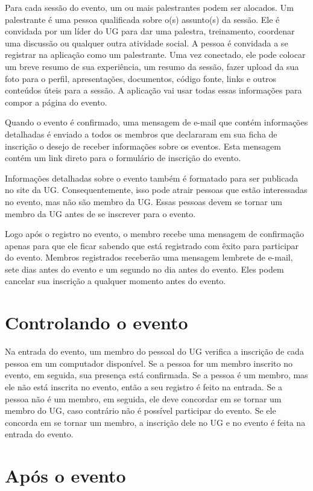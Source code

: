 \documentclass[envcountsame,envcountchap]{svmono}
\begin{document}
Para cada sessão do evento, um ou mais palestrantes podem ser alocados. Um palestrante é uma pessoa qualificada sobre o(s) assunto(s) da sessão. Ele é convidada por um líder do UG para dar uma palestra, treinamento, coordenar uma discussão ou qualquer outra atividade social. A pessoa é convidada a se registrar na aplicação como um palestrante. Uma vez conectado, ele pode colocar um breve resumo de sua experiência, um resumo da sessão, fazer upload da sua foto para o perfil, apresentações, documentos, código fonte, links e outros conteúdos úteis para a sessão. A aplicação vai usar todas essas informações para compor a página do evento.

Quando o evento é confirmado, uma mensagem de e-mail que contém informações detalhadas é enviado a todos os membros que declararam em sua ficha de inscrição o desejo de receber informações sobre os eventos. Esta mensagem contém um link direto para o formulário de inscrição do evento.

Informações detalhadas sobre o evento também é formatado para ser publicada no site da UG. Consequentemente, isso pode atrair pessoas que estão interessadas no evento, mas não são membro da UG. Essas pessoas devem se tornar um membro da UG antes de se inscrever para o evento.

Logo após o registro no evento, o membro recebe uma mensagem de confirmação apenas para que ele ficar sabendo que está registrado com êxito para participar do evento. Membros registrados receberão uma mensagem lembrete de e-mail, sete dias antes do evento e um segundo no dia antes do evento. Eles podem cancelar sua inscrição a qualquer momento antes do evento.

\section{Controlando o evento}

Na entrada do evento, um membro do pessoal do UG verifica a inscrição de cada pessoa em um computador disponível. Se a pessoa for um membro inscrito no evento, em seguida, sua presença está confirmada. Se a pessoa é um membro, mas ele não está inscrita no evento, então a seu registro é feito na entrada. Se a pessoa não é um membro, em seguida, ele deve concordar em se tornar um membro do UG, caso contrário não é possível participar do evento. Se ele concorda em se tornar um membro, a inscrição dele no UG e no evento é feita na entrada do evento.

\section{Após o evento}
\end{document}

